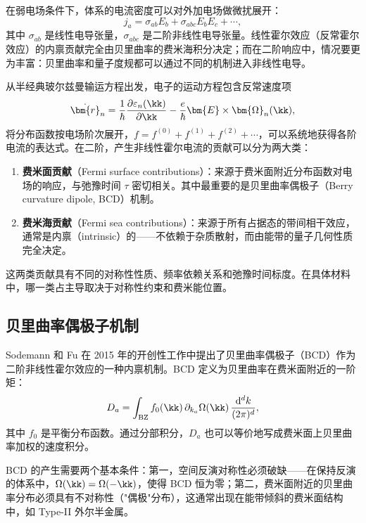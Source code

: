 在弱电场条件下，体系的电流密度可以对外加电场做微扰展开：
\begin{equation}
  j_a = \sigma_{ab} E_b + \sigma_{abc} E_b E_c + \cdots,
\end{equation}
其中 $\sigma_{ab}$ 是线性电导张量，$\sigma_{abc}$ 是二阶非线性电导张量。线性霍尔效应（反常霍尔效应）的内禀贡献完全由贝里曲率的费米海积分决定\cite{nagaosa_anomalous_2010}；而在二阶响应中，情况要更为丰富：贝里曲率和量子度规都可以通过不同的机制进入非线性电导。

从半经典玻尔兹曼输运方程出发，电子的运动方程包含反常速度项
\begin{equation}
  \dot{\bm{r}}_n = \frac{1}{\hbar}\frac{\partial \varepsilon_n(\kk)}{\partial \kk} - \frac{e}{\hbar}\bm{E} \times \bm{\Omega}_n(\kk),
\end{equation}
将分布函数按电场阶次展开，$f = f^{(0)} + f^{(1)} + f^{(2)} + \cdots$，可以系统地获得各阶电流的表达式。在二阶，产生非线性霍尔电流的贡献可以分为两大类：
\begin{enumerate}
  \item \textbf{费米面贡献}（Fermi surface contributions）：来源于费米面附近分布函数对电场的响应，与弛豫时间 $\tau$ 密切相关。其中最重要的是贝里曲率偶极子（Berry curvature dipole, BCD）机制\cite{PhysRevLett.115.216806}。
  \item \textbf{费米海贡献}（Fermi sea contributions）：来源于所有占据态的带间相干效应，通常是内禀（intrinsic）的——不依赖于杂质散射，而由能带的量子几何性质完全决定\cite{gao_field_2014,gao_orbital_2018}。
\end{enumerate}
这两类贡献具有不同的对称性性质、频率依赖关系和弛豫时间标度。在具体材料中，哪一类占主导取决于对称性约束和费米能位置。

\subsection{贝里曲率偶极子机制}

Sodemann 和 Fu 在 2015 年的开创性工作\cite{PhysRevLett.115.216806}中提出了贝里曲率偶极子（BCD）作为二阶非线性霍尔效应的一种内禀机制。BCD 定义为贝里曲率在费米面附近的一阶矩：
\begin{equation}
  D_a = \int_{\mathrm{BZ}} f_0(\kk) \, \partial_{k_a} \Omega(\kk) \, \frac{\mathrm{d}^d k}{(2\pi)^d},
\end{equation}
其中 $f_0$ 是平衡分布函数。通过分部积分，$D_a$ 也可以等价地写成费米面上贝里曲率加权的速度积分。

BCD 的产生需要两个基本条件：第一，空间反演对称性必须破缺——在保持反演的体系中，$\Omega(\kk) = \Omega(-\kk)$，使得 BCD 恒为零；第二，费米面附近的贝里曲率分布必须具有不对称性（"偶极"分布），这通常出现在能带倾斜的费米面结构中，如 Type-II 外尔半金属\cite{type2Weyl}。

